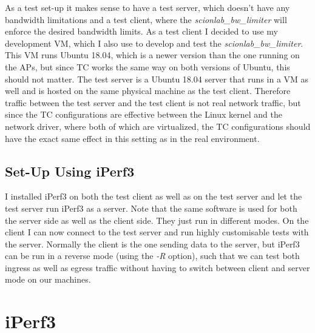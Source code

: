 As a test set-up it makes sense to have a test server, which doesn't have any bandwidth limitations and a test client, where the \textit{scionlab\_bw\_limiter} will enforce the desired bandwidth limits. As a test client I decided to use my development \acs{VM}, which I also use to develop and test the \textit{scionlab\_bw\_limiter}. This \acs{VM} runs Ubuntu 18.04, which is a newer version than the one running on the \aclp{AP}, but since \acs{TC} works the same way on both versions of Ubuntu, this should not matter. The test server is a Ubuntu 18.04 server that runs in a \acs{VM} as well and is hosted on the same physical machine as the test client. Therefore traffic between the test server and the test client is not real network traffic, but since the \acs{TC} configurations are effective between the Linux kernel and the network driver, where both of which are virtualized, the \acs{TC} configurations should have the exact same effect in this setting as in the real environment.

\subsection{Set-Up Using iPerf3}

I installed iPerf3 on both the test client as well as on the test server and let the test server run iPerf3 as a server. Note that the same software is used for both the server side as well as the client side. They just run in different modes. On the client I can now connect to the test server and run highly customisable tests with the server. Normally the client is the one sending data to the server, but iPerf3 can be run in a reverse mode (using the \textit{-R} option), such that we can test both ingress as well as egress traffic without having to switch between client and server mode on our machines.

\section{iPerf3}

